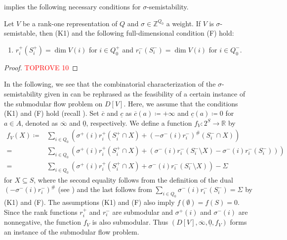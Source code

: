 \documentclass[a4paper,11pt]{article}
\numberwithin{equation}{section}
\newcommand{\R}{\mathbb{R}}
\newcommand{\Z}{\mathbb{Z}}
\begin{document}
 implies the following necessary conditions for $\sigma$-semistability.
\begin{corollary}\label{cor:necessary}
    Let $V$ be a rank-one representation of $Q$ and $\sigma \in \Z^{Q_0}$ a weight.
    If $V$ is $\sigma$-semistable,
    then {\rm (K1)} and the following full-dimensional condition {\rm (F)} hold:
    \begin{enumerate}[{label={\upshape{(F)}}}]
        \item $r_i^+(S_i^+) = \dim V(i)$ for $i \in Q_0^+$ and $r_i^-(S_i^-) = \dim V(i)$ for $i \in Q_0^-$.
    \end{enumerate}
\end{corollary}
\begin{proof}\textcolor{red}{TOPROVE 10}\end{proof}

In the following, we see that the combinatorial characterization of the $\sigma$-semistability given in  can be rephrased as the feasibility of a certain instance of the submodular flow problem on $D[V]$.
Here, we assume that the conditions (K1)
and (F) hold (recall ).
Set $\overline{c}$ and $\underline{c}$ as $\overline{c}(a) \coloneqq +\infty$ and $\underline{c}(a) \coloneqq 0$ for $a \in A$,
denoted as $\overline{\infty}$ and $\underline{0}$, respectively.
We define a function $f_V : 2^S \to \R$ by
\begin{align}
    f_V(X) \coloneqq& \sum_{i \in Q_0} \left(\sigma^+(i) r_i^+(S_i^+ \cap X) +  (-\sigma^-(i) r_i^-)^\# (S_i^- \cap X) \right)\\
    {}=& \sum_{i \in Q_0} \left(\sigma^+(i) r_i^+(S_i^+ \cap X) +  \left(\sigma^-(i) r_i^-(S_i^- \setminus X) - \sigma^-(i)r_i^-(S_i^-)\right) \right)\\
    {}=& \sum_{i \in Q_0} \left(\sigma^+(i) r_i^+(S_i^+ \cap X) +  \sigma^-(i) r_i^-(S_i^- \setminus X) \right) - \Sigma \label{eq:f_V}
\end{align}
for $X \subseteq S$,
where the second equality follows from the definition of the dual $(-\sigma^-(i) r_i^-)^\#$ (see )
and the last follows from $\sum_{i \in Q_0} \sigma^-(i) r_i^-(S_i^-) = \Sigma$ by (K1) and (F).
The assumptions (K1) and (F) also imply $f(\emptyset) = f(S) = 0$.
Since the rank functions $r_i^+$ and $r_i^-$ are submodular and $\sigma^+(i)$ and $\sigma^-(i)$ are nonnegative,
the function $f_V$ is also submodular.
Thus $(D[V], \overline{\infty}, \underline{0}, f_V)$ forms an instance of the submodular flow problem.
\end{document}
